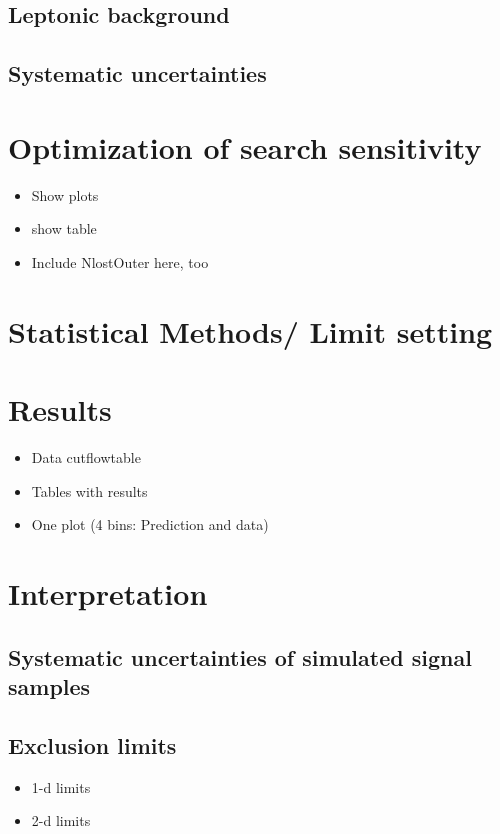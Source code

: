 \subsection{Leptonic background}
\subsection{Systematic uncertainties}

\section{Optimization of search sensitivity}
\label{sec:Optimization}
\begin{itemize}
\item Show plots
\item show table
\item Include NlostOuter here, too
\end{itemize}

\section{Statistical Methods/ Limit setting}
\label{sec:LimitSetting}

\section{Results}
\label{sec:Results}
\begin{itemize}
\item Data cutflowtable
\item Tables with results
\item One plot (4 bins: Prediction and data)
\end{itemize}

\section{Interpretation}
\label{sec:Interpretation}
\subsection{Systematic uncertainties of simulated signal samples}
\subsection{Exclusion limits}
\begin{itemize}
\item 1-d limits
\item 2-d limits
\end{itemize}

